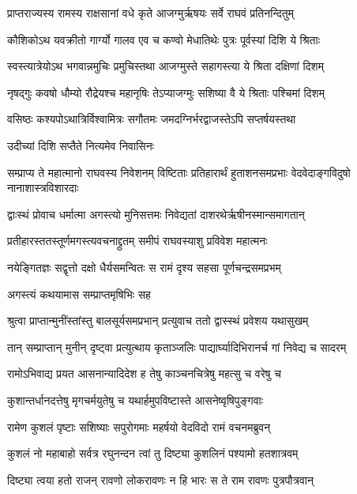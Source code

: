 
\twolineshloka
{प्राप्तराज्यस्य रामस्य राक्षसानां वधे कृते}
{आजग्मुर्ऋषयः सर्वे राघवं प्रतिनन्दितुम्} %

\twolineshloka
{कौशिकोऽथ यवक्रीतो गार्ग्यो गालव एव च}
{कण्वो मेधातिथेः पुत्रः पूर्वस्यां दिशि ये श्रिताः} %

\twolineshloka
{स्वस्त्यात्रेयोऽथ भगवान्नमुचिः प्रमुचिस्तथा}
{आजग्मुस्ते सहागस्त्या ये श्रिता दक्षिणां दिशम्} %

\twolineshloka
{नृषद्गुः कवषो धौम्यो रौद्रेयश्च महानृषिः}
{तेऽप्याजग्मुः सशिष्या वै ये श्रिताः पश्चिमां दिशम्} %

\twolineshloka
{वसिष्ठः कश्यपोऽथात्रिर्विश्वामित्रः सगौतमः}
{जमदग्निर्भरद्वाजस्तेऽपि सप्तर्षयस्तथा} %

\onelineshloka
{उदीच्यां दिशि सप्तैते नित्यमेव निवासिनः} %

\threelineshloka
{सम्प्राप्य ते महात्मानो राघवस्य निवेशनम्}
{विष्टिताः प्रतिहारार्थं हुताशनसमप्रभाः}
{वेदवेदाङ्गविदुषो नानाशास्त्रविशारदाः} %

\twolineshloka
{द्वाःस्थं प्रोवाच धर्मात्मा अगस्त्यो मुनिसत्तमः}
{निवेद्यतां दाशरथेर्ऋषीनस्मान्समागतान्} %

\twolineshloka
{प्रतीहारस्ततस्तूर्णमगस्त्यवचनाद्द्रुतम्}
{समीपं राघवस्याशु प्रविवेश महात्मनः} %

\twolineshloka
{नयेङ्गितज्ञः सद्वृत्तो दक्षो धैर्यसमन्वितः}
{स रामं दृश्य सहसा पूर्णचन्द्रसमप्रभम्} %

\onelineshloka
{अगस्त्यं कथयामास सम्प्राप्तमृषिभिः सह} %

\twolineshloka
{श्रुत्वा प्राप्तान्मुनींस्तांस्तु बालसूर्यसमप्रभान्}
{प्रत्युवाच ततो द्वास्स्थं प्रवेशय यथासुखम्} %

\twolineshloka
{तान् सम्प्राप्तान् मुनीन् दृष्ट्वा प्रत्युत्थाय कृताञ्जलिः}
{पाद्यार्घ्यादिभिरानर्च गां निवेद्य च सादरम्} %

\twolineshloka
{रामोऽभिवाद्य प्रयत आसनान्यादिदेश ह}
{तेषु काञ्चनचित्रेषु महत्सु च वरेषु च} %

\twolineshloka
{कुशान्तर्धानदत्तेषु मृगचर्मयुतेषु च}
{यथार्हमुपविष्टास्ते आसनेष्वृषिपुङ्गवाः} %

\twolineshloka
{रामेण कुशलं पृष्टाः सशिष्याः सपुरोगमाः}
{महर्षयो वेदविदो रामं वचनमब्रुवन्} %

\twolineshloka
{कुशलं नो महाबाहो सर्वत्र रघुनन्दन}
{त्वां तु दिष्ट्या कुशलिनं पश्यामो हतशात्रवम्} %

\twolineshloka
{दिष्ट्या त्वया हतो राजन् रावणो लोकरावणः}
{न हि भारः स ते राम रावणः पुत्रपौत्रवान्} %

